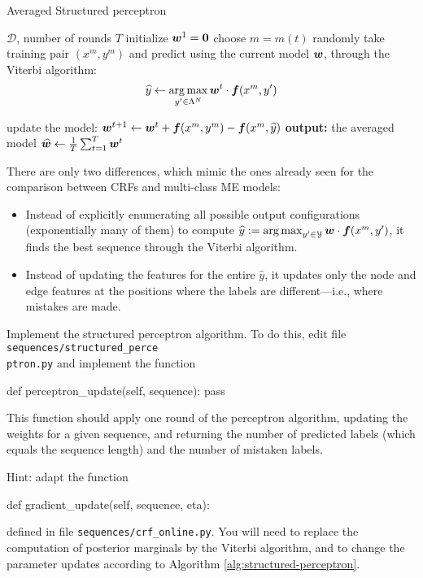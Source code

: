 \begin{algorithm}[h!]
   \caption{Averaged Structured perceptron \label{alg:structured-perceptron}}
\begin{algorithmic}[1]
    $\mathcal{D}$, number of rounds $T$
   \STATE initialize $\boldsymbol{w}^1 = \mathbf{0}$
	\STATE choose $m=m(t)$ randomly
	\STATE take training pair $(x^m, y^m)$ and 
predict using the current model $\boldsymbol{w}$, through the Viterbi algorithm: 
	$$\widehat{y}  \leftarrow \operatorname*{arg\,max}_{y' \in \Lambda^N} \boldsymbol{w}^t \cdot \boldsymbol{f}(x^m,y')$$	

	\STATE update the model: 
	$\boldsymbol{w}^{t+1} \leftarrow \boldsymbol{w}^{t} + \boldsymbol{f}(x^m,y^m) - \boldsymbol{f}(x^m,\widehat{y})$
	\ENDFOR
   \STATE \textbf{output:} the averaged model $\widehat{\boldsymbol{w}} \leftarrow \frac{1}{T}\sum_{t=1}^T \boldsymbol{w}^t$
\end{algorithmic}
\end{algorithm}



There are only two differences, which mimic the ones already seen for the comparison between CRFs 
and multi-class ME models:
\begin{itemize}
\item Instead of explicitly enumerating all possible output 
configurations (exponentially many of them) to compute 
 $\widehat{y} := \operatorname*{arg\,max}_{y'\in\mathcal{Y}} \boldsymbol{w} \cdot \boldsymbol{f}(x^m,y')$, 
it finds the best sequence through the Viterbi algorithm. 
\item Instead of updating the features for the entire $\widehat{y}$, 
it updates only the node and edge features at the positions where the
  labels are different---i.e., where mistakes are made.
\end{itemize}





\begin{exercise}\label{exer:strucperc1}
Implement the structured perceptron algorithm. 
To do this, edit file { \tt sequences/structured\_perce\\ ptron.py} 
and implement the function
\begin{python}
def perceptron_update(self, sequence):
    pass
\end{python}
This function should apply one round of the perceptron algorithm,
updating the weights for a given sequence, and returning
the number of predicted labels (which equals the sequence length) 
and the number of mistaken labels. 

Hint: adapt the function 
\begin{python}
def gradient_update(self, sequence, eta):
\end{python}
defined in file {\tt sequences/crf\_online.py}. 
You will need to replace the computation of posterior marginals 
by the Viterbi algorithm, and to change the parameter updates 
according to Algorithm \ref{alg:structured-perceptron}.
\end{exercise}


